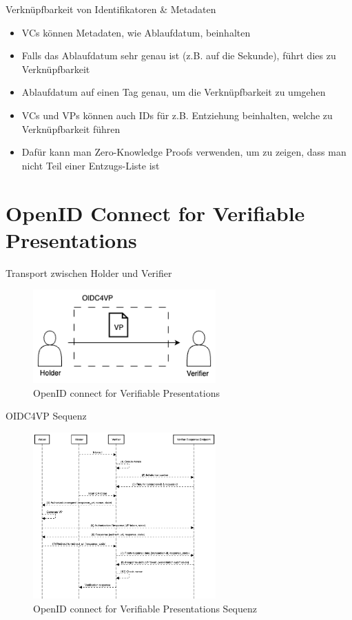 \documentclass[
	german,%
	authorontitle=true,
	]{bfhbeamer}
\begin{document}
\begin{frame}{Verknüpfbarkeit von Identifikatoren \& Metadaten}
    \begin{itemize}
        \item VCs können Metadaten, wie Ablaufdatum, beinhalten
        \item Falls das Ablaufdatum sehr genau ist (z.B. auf die Sekunde), führt dies zu Verknüpfbarkeit
        \item Ablaufdatum auf einen Tag genau, um die Verknüpfbarkeit zu umgehen
        \item VCs und VPs können auch IDs für z.B. Entziehung beinhalten, welche zu Verknüpfbarkeit führen
        \item Dafür kann man Zero-Knowledge Proofs verwenden, um zu zeigen, dass man nicht Teil einer Entzugs-Liste ist
    \end{itemize}
\end{frame}

\section{OpenID Connect for Verifiable Presentations}

\begin{frame}{Transport zwischen Holder und Verifier}
    \begin{figure}
        \centering
        \includegraphics[width=70mm]{../img/OIDC4VP.png}
        \caption{OpenID connect for Verifiable Presentations}
    \end{figure}
\end{frame}

\begin{frame}{OIDC4VP Sequenz}
    \begin{figure}
        \centering
        \includegraphics[width=70mm]{../img/OIDC4VPFlow.png}
        \caption{OpenID connect for Verifiable Presentations Sequenz}
    \end{figure}
\end{frame}
\end{document}
